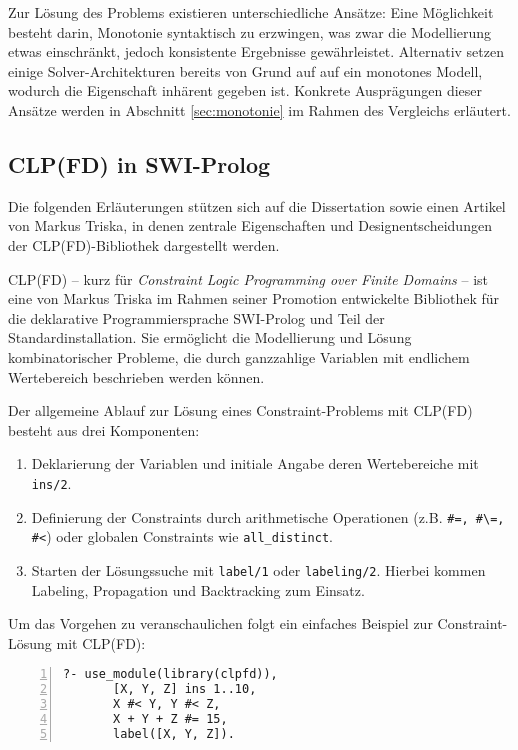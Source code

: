 \documentclass[12pt,a4paper]{article}
\begin{document}
Zur Lösung des Problems existieren unterschiedliche Ansätze: Eine Möglichkeit besteht darin, Monotonie syntaktisch zu erzwingen, was zwar die Modellierung etwas einschränkt, jedoch konsistente Ergebnisse gewährleistet.
Alternativ setzen einige Solver-Architekturen bereits von Grund auf auf ein monotones Modell, wodurch die Eigenschaft inhärent gegeben ist.
Konkrete Ausprägungen dieser Ansätze werden in Abschnitt \ref{sec:monotonie} im Rahmen des Vergleichs erläutert.
\subsection{CLP(FD) in SWI-Prolog}
\label{sec:clpfd}
Die folgenden Erläuterungen stützen sich auf die Dissertation \cite{drt} sowie einen Artikel \cite{clpfd} von Markus Triska, in denen zentrale Eigenschaften und Designentscheidungen der CLP(FD)-Bibliothek dargestellt werden.

CLP(FD) -- kurz für \emph{Constraint Logic Programming over Finite Domains} -- ist eine von Markus Triska im Rahmen seiner Promotion entwickelte Bibliothek für die deklarative Programmiersprache SWI-Prolog und Teil der Standardinstallation. 
Sie ermöglicht die Modellierung und Lösung kombinatorischer Probleme, die durch ganzzahlige Variablen mit endlichem Wertebereich beschrieben werden können.

Der allgemeine Ablauf zur Lösung eines Constraint-Problems mit CLP(FD) besteht aus drei Komponenten:
\begin{enumerate}
    \item Deklarierung der Variablen und initiale Angabe deren Wertebereiche mit \texttt{ins/2}.
    \item Definierung der Constraints durch arithmetische Operationen (z.B. \texttt{\#=, \#\textbackslash=, \#<}) oder globalen Constraints wie \texttt{all\_distinct}.
    \item Starten der Lösungssuche mit \texttt{label/1} oder \texttt{labeling/2}. Hierbei kommen Labeling, Propagation und Backtracking zum Einsatz.
\end{enumerate}

\noindent
Um das Vorgehen zu veranschaulichen folgt ein einfaches Beispiel zur Constraint-Lösung mit CLP(FD):

\begin{Verbatim}[numbers=left, xleftmargin=5mm, frame=lines]
    ?- use_module(library(clpfd)),
       [X, Y, Z] ins 1..10,
       X #< Y, Y #< Z,
       X + Y + Z #= 15,
       label([X, Y, Z]).
\end{Verbatim}
\end{document}
